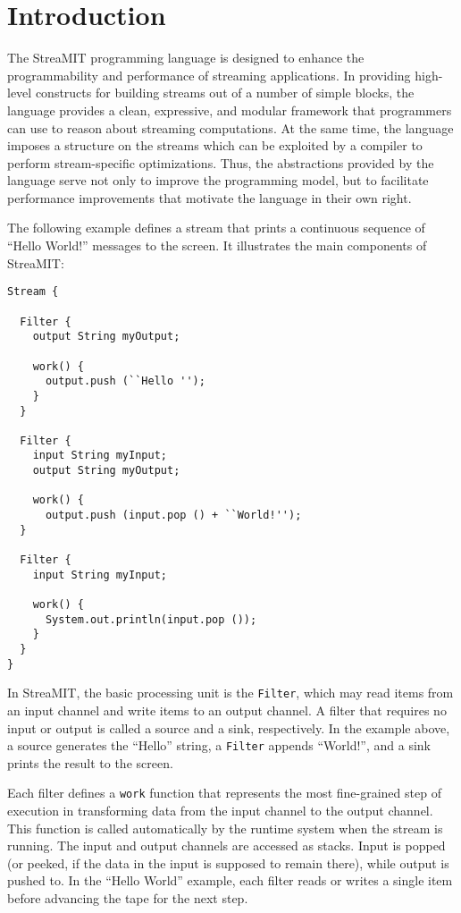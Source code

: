 \documentclass[draft]{article}
\begin{document}
\section{Introduction}
\label{sec:intro}

The StreaMIT programming language is designed to enhance the
programmability and performance of streaming applications.  In
providing high-level constructs for building streams out of a number
of simple blocks, the language provides a clean, expressive, and
modular framework that programmers can use to reason about streaming
computations.  At the same time, the language imposes a structure on
the streams which can be exploited by a compiler to perform
stream-specific optimizations.  Thus, the abstractions provided by the
language serve not only to improve the programming model, but to
facilitate performance improvements that motivate the language in
their own right.

The following example defines a stream that prints a continuous
sequence of ``Hello World!'' messages to the screen.  It illustrates
the main components of StreaMIT:

\begin{verbatim}
Stream {

  Filter {
    output String myOutput;

    work() {
      output.push (``Hello '');
    }
  }

  Filter {
    input String myInput;
    output String myOutput;

    work() {
      output.push (input.pop () + ``World!'');
  }

  Filter {
    input String myInput;
    
    work() {
      System.out.println(input.pop ());
    }
  }
}
\end{verbatim}

In StreaMIT, the basic processing unit is the {\tt Filter}, which
may read items from an input channel and write items to an output
channel.  A filter that requires no input or output is called a
source and a sink, respectively.  In the example above, a 
source generates the ``Hello'' string, a {\tt Filter} appends
``World!'', and a sink prints the result to the screen.

Each filter defines a {\tt work} function that represents the most
fine-grained step of execution in transforming data from the input
channel to the output channel.  This function is called automatically
by the runtime system when the stream is running.  The input and
output channels are accessed as stacks.  Input is popped (or peeked, if
the data in the input is supposed to remain there),
while output is pushed to.  In the ``Hello World'' example, each 
filter reads or writes a single item before advancing the tape for 
the next step.
\end{document}

